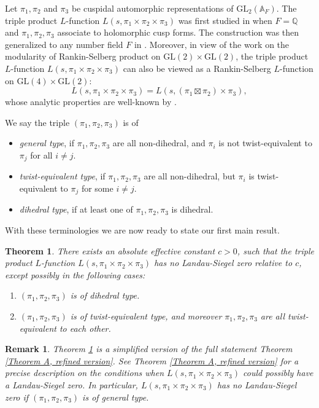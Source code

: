 \documentclass[12pt]{amsart}
\newcommand{\bA}{\mathbb{A}}
\newcommand{\bQ}{\mathbb{Q}}
\newcommand{\GL}{\text{GL}}
\newtheorem{remark}{Remark}[section]
\newtheorem{thmx}{Theorem}
\begin{document}
Let $\pi_1,\pi_2$ and $\pi_3$ be cuspidal automorphic representations of $\GL_2(\bA_F)$. The triple product $L$-function $L(s,\pi_1 \times \pi_2 \times \pi_3)$ was first studied in \cite{Garrett1987} when $F = \bQ$ and $\pi_1,\pi_2,\pi_3$ associate to holomorphic cusp forms. The construction was then generalized to any number field $F$ in \cite{P-SRallis1987}. Moreover, in view of the work \cite{Ramakrishnan2000} on the modularity of Rankin-Selberg product on $\GL(2) \times \GL(2)$, the triple product $L$-function $L(s,\pi_1 \times \pi_2 \times \pi_3)$ can also be viewed as a Rankin-Selberg $L$-function on $\GL(4) \times \GL(2)$:
\begin{equation*}
    L(s,\pi_1 \times \pi_2 \times \pi_3) = L(s,(\pi_1 \boxtimes \pi_2) \times \pi_3),
\end{equation*}
whose analytic properties are well-known by \cite{JacquetP-SShalika1983}.

We say the triple $(\pi_1,\pi_2,\pi_3)$ is of 
\begin{itemize}
    \item \textit{general type}, if $\pi_1,\pi_2,\pi_3$ are all non-dihedral, and $\pi_i$ is not twist-equivalent to $\pi_j$ for all $i \neq j$.
    \item \textit{twist-equivalent type}, if $\pi_1,\pi_2,\pi_3$ are all non-dihedral, but $\pi_i$ is twist-equivalent to $\pi_j$ for some $i \neq j$.
    \item \textit{dihedral type}, if at least one of $\pi_1,\pi_2,\pi_3$ is dihedral. 
\end{itemize}

With these terminologies we are now ready to state our first main result. 
\begin{thmx}\label{Theorem A}
    There exists an absolute effective constant $c>0$, such that the triple product $L$-function $L(s,\pi_1 \times \pi_2 \times \pi_3)$ has no Landau-Siegel zero relative to $c$, except possibly in the following cases:
    \begin{enumerate}
        \item $(\pi_1,\pi_2,\pi_3)$ is of dihedral type.
        \item $(\pi_1,\pi_2,\pi_3)$ is of twist-equivalent type, and moreover $\pi_1,\pi_2,\pi_3$ are all twist-equivalent to each other.
    \end{enumerate}
\end{thmx}

\begin{remark}
    Theorem \ref{Theorem A} is a simplified version of the full statement Theorem \ref{Theorem A, refined version}. See Theorem \ref{Theorem A, refined version} for a precise description on the conditions when $L(s,\pi_1 \times \pi_2 \times \pi_3)$ could possibly have a Landau-Siegel zero. In particular, $L(s,\pi_1 \times \pi_2 \times \pi_3)$ has no Landau-Siegel zero if $(\pi_1,\pi_2,\pi_3)$ is of general type.
\end{remark}
\end{document}
